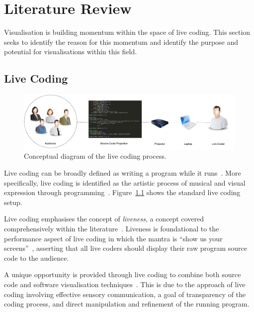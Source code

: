 
\chapter{Literature Review}
\label{chap:literature-review}

Visualisation is building momentum within the space of live coding. This section seeks to identify the reason for this momentum and identify the purpose and potential for visualisations within this field.

\section{Live Coding}

\begin{figure}
\centering
\includegraphics[width=1.0\textwidth]{../images/live-coding-setup.pdf}
\caption[The live coding process]{Conceptual diagram of the live coding process.}
\label{fig:live-coding-setup}
\end{figure}

Live coding can be broadly defined as writing a program while it runs~\cite{Ward2004}. More specifically, live coding is identified as the artistic process of musical and visual expression through programming~\cite{Collins2003}. Figure~\ref{fig:live-coding-setup} shows the standard live coding setup.

Live coding emphasises the concept of \emph{liveness}, a concept covered comprehensively within the literature~\cite{Auslander,Masura2007}. Liveness is foundational to the performance aspect of live coding in which the mantra is ``show us your screens''~\cite{Toplap}, asserting that all live coders should display their raw program source code to the audience.

A unique opportunity is provided through live coding to combine both source code and software visualisation techniques~\cite{McLean2010a}. This is due to the approach of live coding involving effective sensory communication, a goal of transparency of the coding process, and direct manipulation and refinement of the running program.

